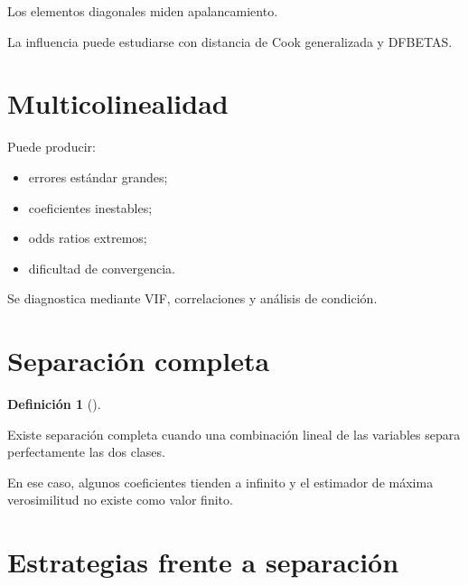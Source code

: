 \documentclass[
  spanish,
  10.5pt,
  letterpaper,
  DIV=11,
  numbers=noendperiod,
  oneside,
  open=any]{scrreprt}
\providecommand{\tightlist}{%
  \setlength{\itemsep}{0pt}\setlength{\parskip}{0pt}}
\theoremstyle{definition}
\newtheorem{definition}{Definición}[chapter]
\theoremstyle{definition}
\theoremstyle{plain}
\theoremstyle{remark}
\begin{document}
Los elementos diagonales miden apalancamiento.

La influencia puede estudiarse con distancia de Cook generalizada y
DFBETAS.

\section*{Multicolinealidad}\label{multicolinealidad-1}


Puede producir:

\begin{itemize}
\tightlist
\item
  errores estándar grandes;
\item
  coeficientes inestables;
\item
  odds ratios extremos;
\item
  dificultad de convergencia.
\end{itemize}

Se diagnostica mediante VIF, correlaciones y análisis de condición.

\section*{Separación completa}\label{separaciuxf3n-completa}


\begin{definition}[]\protect\hypertarget{def-separacion-completa}{}\label{def-separacion-completa}

Existe separación completa cuando una combinación lineal de las
variables separa perfectamente las dos clases.

\end{definition}

En ese caso, algunos coeficientes tienden a infinito y el estimador de
máxima verosimilitud no existe como valor finito.

\section*{Estrategias frente a
separación}\label{estrategias-frente-a-separaciuxf3n}

\end{document}
